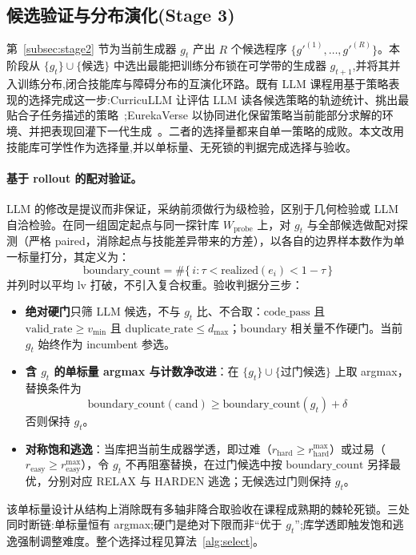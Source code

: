 \documentclass[11pt,a4paper,fontset=noto]{ctexart}
\newcommand{\realized}{\mathrm{realized}}
\newcommand{\lv}{\mathrm{lv}}
\newcommand{\bcount}{\mathrm{boundary\_count}}
\newcommand{\Wprobe}{W_{\mathrm{probe}}}
\begin{document}
\subsection{候选验证与分布演化(Stage 3)}
\label{subsec:stage3}

第~\ref{subsec:stage2} 节为当前生成器 $g_t$ 产出 $R$ 个候选程序 $\{g'^{(1)},\dots,g'^{(R)}\}$。本阶段从 $\{g_t\}\cup\{\text{候选}\}$ 中选出最能把训练分布锁在可学带的生成器 $g_{t+1}$,并将其并入训练分布,闭合技能库与障碍分布的互演化环路。既有 LLM 课程用基于策略表现的选择完成这一步:CurricuLLM 让评估 LLM 读各候选策略的轨迹统计、挑出最贴合子任务描述的策略~\citep{curricullm};EurekaVerse 以协同进化保留策略当前能部分求解的环境、并把表现回灌下一代生成~\citep{eurekaverse}。二者的选择量都来自单一策略的成败。本文改用技能库可学性作为选择量,并以单标量、无死锁的判据完成选择与验收。

\paragraph{基于 rollout 的配对验证。}LLM 的修改是提议而非保证，采纳前须做行为级检验，区别于几何检验或 LLM 自洽检验。在同一组固定起点与同一探针库 $\Wprobe$ 上，对 $g_t$ 与全部候选做配对探测（严格 paired，消除起点与技能差异带来的方差），以各自的边界样本数作为单一标量打分，其定义为：
\begin{equation}
\bcount = \#\{\, i : \tau < \realized(e_i) < 1-\tau \,\}
\end{equation}
并列时以平均 $\lv$ 打破，不引入复合权重。验收判据分三步：

\begin{itemize}
  \item \textbf{绝对硬门}只筛 LLM 候选，不与 $g_t$ 比、不合取：$\text{code\_pass}$ 且 $\text{valid\_rate} \ge v_{\min}$ 且 $\text{duplicate\_rate} \le d_{\max}$；boundary 相关量不作硬门。当前 $g_t$ 始终作为 incumbent 参选。
  \item \textbf{含 $g_t$ 的单标量 argmax 与计数净改进}：在 $\{g_t\}\cup\{\text{过门候选}\}$ 上取 argmax，替换条件为
  \[
  \bcount(\text{cand}) \ge \bcount(g_t) + \delta
  \]
  否则保持 $g_t$。
  \item \textbf{对称饱和逃逸}：当库把当前生成器学透，即过难（$r_{\mathrm{hard}} \ge r_{\mathrm{hard}}^{\max}$）或过易（$r_{\mathrm{easy}} \ge r_{\mathrm{easy}}^{\max}$），令 $g_t$ 不再阻塞替换，在过门候选中按 $\bcount$ 另择最优，分别对应 RELAX 与 HARDEN 逃逸；无候选过门则保持 $g_t$。
\end{itemize}
该单标量设计从结构上消除既有多轴非降合取验收在课程成熟期的棘轮死锁。三处同时断链:单标量恒有 argmax;硬门是绝对下限而非“优于 $g_t$”;库学透即触发饱和逃逸强制调整难度。整个选择过程见算法~\ref{alg:select}。
\end{document}
